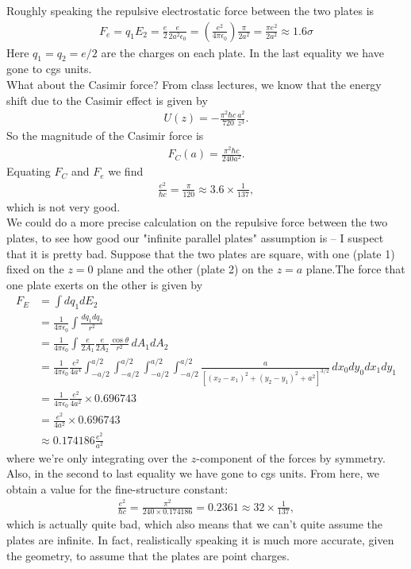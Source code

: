 \documentclass{article}
\theoremstyle{definition}
\newcommand{\f}[2]{\frac{#1}{#2}}
\newcommand{\lp}{\left(}
\newcommand{\rp}{\right)}
\begin{document}
\noindent Roughly speaking the repulsive electrostatic force between the two plates is 
\begin{align*}
F_e = q_1 E_2 = \f{e}{2} \f{e}{2a^2\epsilon_0} = \lp \f{e^2}{4\pi \epsilon_0} \rp \f{\pi }{2a^2} = \f{\pi e^2}{2a^2} \approx 1.6 \sigma
\end{align*}
Here $q_1 = q_2 = e/2 $ are the charges on each plate. In the last equality we have gone to cgs units.\\

\noindent What about the Casimir force? From class lectures, we know that the energy shift due to the Casimir effect is given by 
\begin{align*}
U(z) = -\f{\pi^2 \hbar c}{720 } \f{a^2 }{z^3}.
\end{align*}
So the magnitude of the Casimir force is 
\begin{align*}
F_C(a) =  \f{\pi^2 \hbar c }{240 a^2}.
\end{align*}
Equating $F_C$ and $F_e$ we find 
\begin{align*}
\f{e^2}{\hbar c} = \f{\pi}{120} \approx 3.6 \times \f{1}{137},
\end{align*}
which is not very good.\\


We could do a more precise calculation on the repulsive force between the two plates, to see how good our "infinite parallel plates" assumption is -- I suspect that it is pretty bad. Suppose that the two plates are square, with one (plate 1) fixed on the $z=0$ plane and the other (plate 2) on the $z=a$ plane.The force that one plate exerts on the other is given by
\begin{align*}
F_E 
&= \int dq_1 dE_2 \\
&= \f{1}{4\pi \epsilon_0} \int \f{dq_1 dq_2}{r^2} \\
&= \f{1}{4\pi \epsilon_0} \int \f{e}{2A_1} \f{e}{2A_2 }  \f{\cos\theta}{r^2}  \, dA_1  dA_2 \\
&= \f{1}{4\pi \epsilon_0} \f{e^2}{4a^4} \int_{-a/2}^{a/2}\int_{-a/2}^{a/2}\int_{-a/2}^{a/2}\int_{-a/2}^{a/2} \f{a}{ [ (x_2 - x_1)^2 + (y_2 - y_1)^2 + a^2 ]^{3/2}} \, dx_0 dy_0 dx_1 dy_1 \\
&= \f{1}{4\pi \epsilon_0} \f{e^2}{4a^2} \times 0.696743  \\
&=  \f{e^2}{4a^2} \times 0.696743  \\
&\approx 0.174186 \f{e^2}{a^2}
\end{align*}
where we're only integrating over the $z$-component of the forces by symmetry. Also, in the second to last equality we have gone to cgs units. From here, we obtain a value for the fine-structure constant:
\begin{align*}
\f{e^2}{\hbar c} = \f{\pi^2}{240 \times 0.174186 }  =  0.2361 \approx 32 \times \f{1}{137},
\end{align*}
which is actually quite bad, which also means that we can't quite assume the plates are infinite. In fact, realistically speaking it is much more accurate, given the geometry, to assume that the plates are point charges. \\
\end{document}
